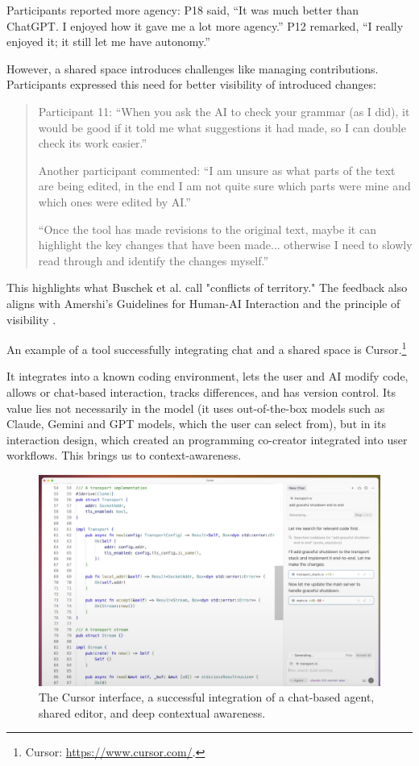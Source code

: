 Participants reported more agency: P18 said, “It was much better than ChatGPT. I enjoyed how it gave me a lot more agency.” P12 remarked, “I really enjoyed it; it still let me have autonomy.” 

However, a shared space introduces challenges like managing contributions. Participants expressed this need for better visibility of introduced changes:
\begin{quote}
Participant 11: “When you ask the AI to check your grammar (as I did), it would be good if it told me what suggestions it had made, so I can double check its work easier.”

Another participant commented: “I am unsure as what parts of the text are being edited, in the end I am not quite sure which parts were mine and which ones were edited by AI.”

“Once the tool has made revisions to the original text, maybe it can highlight the key changes that have been made... otherwise I need to slowly read through and identify the changes myself.”
\end{quote}

This highlights what Buschek et al. \cite{Buschek2021-ks} call "conflicts of territory." The feedback also aligns with Amershi's Guidelines for Human-AI Interaction \cite{Amershi2019-wu} and the principle of visibility \cite{Nielsen1994-df}.

An example of a tool successfully integrating chat and a shared space is Cursor.\footnote{Cursor: \href{https://www.cursor.com/}{https://www.cursor.com/}.}

 It integrates into a known coding environment, lets the user and AI modify code, allows or chat-based interaction, tracks differences, and has version control. Its value lies not necessarily in the model (it uses out-of-the-box models such as Claude, Gemini and GPT models, which the user can select from), but in its interaction design, which created an programming co-creator integrated into user workflows. This brings us to context-awareness.
\begin{figure}[H]
    \centering
    \includegraphics[width=1\linewidth]{cursor.png}
    \caption{The Cursor interface, a successful integration of a chat-based agent, shared editor, and deep contextual awareness.}
    \label{fig:cursor}
\end{figure}

